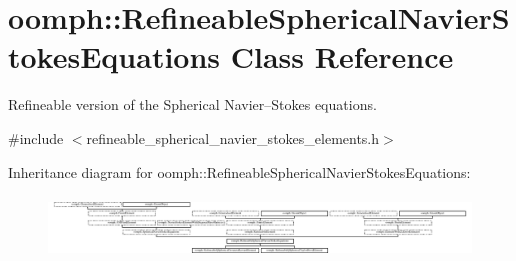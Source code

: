 \hypertarget{classoomph_1_1RefineableSphericalNavierStokesEquations}{}\section{oomph\+:\+:Refineable\+Spherical\+Navier\+Stokes\+Equations Class Reference}
\label{classoomph_1_1RefineableSphericalNavierStokesEquations}


Refineable version of the Spherical Navier--Stokes equations.  




{\ttfamily \#include $<$refineable\+\_\+spherical\+\_\+navier\+\_\+stokes\+\_\+elements.\+h$>$}

Inheritance diagram for oomph\+:\+:Refineable\+Spherical\+Navier\+Stokes\+Equations\+:\begin{figure}[H]
\begin{center}
\leavevmode
\includegraphics[height=1.671642cm]{classoomph_1_1RefineableSphericalNavierStokesEquations}
\end{center}
\end{figure}
